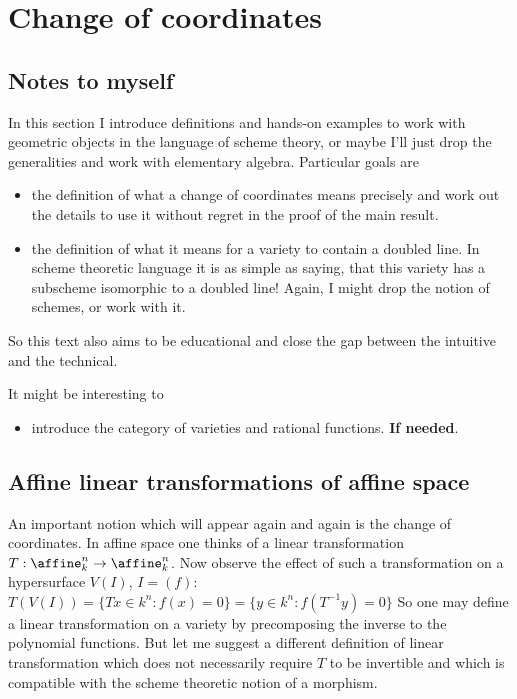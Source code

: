 \section{Change of coordinates}

\subsection{Notes to myself}

In this section I introduce definitions and hands-on examples to work with geometric objects in the language of scheme theory, or maybe I'll just drop the generalities and work with elementary algebra.
Particular goals are
\begin{itemize}
\item the definition of what a change of coordinates means precisely and work out the details to use it without regret in the proof of the main result.
\item the definition of what it means for a variety to contain a doubled line. In scheme theoretic language it is as simple as saying, that this variety has a subscheme isomorphic to a doubled line! Again, I might drop the notion of schemes, or work with it.
\end{itemize}
So this text also aims to be educational and close the gap between the intuitive and the technical.

It might be interesting to
\begin{itemize}
\item introduce the category of varieties and rational functions. \textbf{If needed}.
\end{itemize}

\subsection{Affine linear transformations of affine space}

An important notion which will appear again and again is the change of coordinates.
In affine space one thinks of a linear transformation $T:\affine^n_k \to \affine^n_k$.
Now observe the effect of such a transformation on a hypersurface $V(I)$, $I = (f)$:
$ T(V(I)) = \{ Tx \in k^n: f(x) = 0 \} = \{y \in k^n : f(T^{-1}y) = 0\}$
So one may define a linear transformation on a variety by precomposing the inverse to the polynomial functions.
But let me suggest a different definition of linear transformation which does not necessarily require $T$ to be invertible and which is compatible with the scheme theoretic notion of a morphism.


